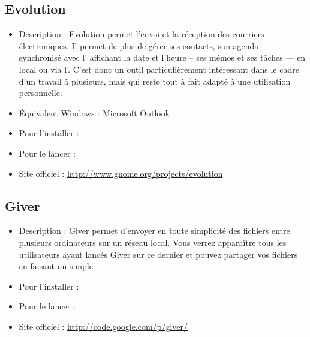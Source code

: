 \subsection{Evolution}
\begin{itemize}
\begingroup
{}
\item Description : Evolution permet l'envoi et la réception des courriers électroniques. Il permet de plus de gérer ses contacts, son agenda -- synchronisé avec l' affichant la date et l'heure -- ses mémos et ses tâches --- en local ou via l'. C'est donc un outil particulièrement intéressant dans le cadre d'un travail à plusieurs, mais qui reste tout à fait adapté à une utilisation personnelle.{\par}
\item Équivalent Windows : Microsoft Outlook{\par}
\item Pour l'installer : 
\item Pour le lancer : 
\item Site officiel : \url{http://www.gnome.org/projects/evolution}{\par}
\endgroup
\end{itemize}

\subsection{Giver}
\begin{itemize}
\begingroup
{}
\item Description : Giver permet d'envoyer en toute simplicité des fichiers entre plusieurs ordinateurs sur un réseau local. Vous verrez apparaître tous les utilisateurs ayant lancés Giver sur ce dernier et pouvez partager vos fichiers en faisant un simple .{\par}
\item Pour l'installer : 
\item Pour le lancer : 
\item Site officiel : \url{http://code.google.com/p/giver/}{\par}
\endgroup
\end{itemize}

